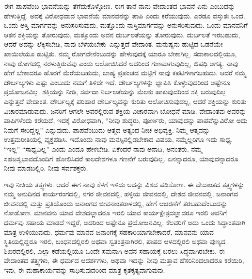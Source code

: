 \vskip 8pt

ಈಗ ಪಾಪವೆಂಬ ಭಾವನೆಯನ್ನು ತೆಗೆದುಕೊಳ್ಳೋಣ. ಈಗ ತಾನೆ ನಾನು ವೇದಾಂತದ ಭಾವನೆ ಏನು ಎಂಬುದನ್ನು ಹೇಳುತ್ತಿದ್ದೆ. ಅದಕ್ಕೆ ವಿರೋಧವಾದ ಭಾವನೆಯೆ ಮಾನವನನ್ನು ಪಾಪಿ ಎಂದು ಕರೆಯುವುದು. ಎರಡೂ ವಸ್ತುತಃ ಒಂದೆ. ಒಂದು ಅಸ್ತಿ ಮಾರ್ಗವನ್ನು ಅನುಸರಿಸುವುದು, ಮತ್ತೊಂದು ನಾಸ್ತಿಮಾರ್ಗವನ್ನು ಅನುಸರಿಸುವುದು. ಒಂದು ಮಾನವನಿಗೆ ಆತನ ಶಕ್ತಿಯನ್ನು ತೋರುವುದು, ಮತ್ತೊಂದು ಅವನ ದುರ್ಬಲತೆಯನ್ನು ತೋರುವುದು. ದುರ್ಬಲತೆ ಇರಬಹುದು, ಆದರೆ ಅದನ್ನು ಲೆಕ್ಕಿಸಬೇಡಿ, ನಾವು ಬೆಳೆಯಬೇಕು–ಎನ್ನುತ್ತದೆ ವೇದಾಂತ. ಮನುಷ್ಯನು ಹುಟ್ಟಿದ ಒಡನೆಯೇ ಖಾಯಿಲೆಯೂ ಹುಟ್ಟಿತು. ನಮ್ಮ ರೋಗವೇನೆಂಬುದನ್ನು ಹೇಳುವುದಕ್ಕೆ ಯಾರೂ ಬೇಕಾಗಿಲ್ಲ. ಸದಾಕಾಲದಲ್ಲಿಯೂ, ನಾವು ರೋಗದಲ್ಲಿ ನರಳುತ್ತಿರುವೆವು ಎಂದು ಆಲೋಚಿಸಿದರೆ ಅದರಿಂದ ಗುಣವಾಗುವುದಿಲ್ಲ, ಔಷಧಿ ಅಗತ್ಯ. ನಾವು ಹೇಗೆ ಬೇಕಾದರೂ ಹೊರಗೆ ಮೆರೆಯಬಹುದು, ಬಾಹ್ಯ ಪ್ರಪಂಚದ ಮಟ್ಟಿಗೆ ನಾವು ಕಪಟಿಗಳಾಗಬಹುದು. ಆದರೆ ನಮ್ಮ ದೌರ್ಬಲ್ಯಗಳು ಎಷ್ಟು ಎಂಬುದು ನಮಗೆ ತಿಳಿದೇ ಇದೆ. ದೌರ್ಬಲ್ಯಗಳನ್ನು ಜ್ಞಾಪಿಸಿ ಕೊಳ್ಳುವುದರಿಂದ ಅಷ್ಟೇನೂ ಪ್ರಯೋಜನವಿಲ್ಲ. ಶಕ್ತಿಯನ್ನು ನೀಡಿ, ಸರ್ವದಾ ನಿರ್ಬಲತೆಯನ್ನು ಮೆಲಕು ಹಾಕುವುದರಿಂದ ಶಕ್ತಿ ಬರುವುದಿಲ್ಲ ಎನ್ನುತ್ತದೆ ವೇದಾಂತ. ದೌರ್ಬಲ್ಯಕ್ಕೆ ಪರಿಹಾರ ದೌರ್ಬಲ್ಯವನ್ನು ಕುರಿತು ಆಲೋಚಿಸುವುದಲ್ಲ, ಆದರೆ ಶಕ್ತಿಯನ್ನು ಕುರಿತು ವಿಚಾರಮಾಡುವುದು. ಜನರಿಗೆ ಆಗಲೇ ಅವರಲ್ಲಿರುವ ಶಕ್ತಿಯ ವಿಚಾರವಾಗಿ ಬೋಧನೆ ಮಾಡಿ. ವೇದಾಂತವು ಅವರನ್ನು ಪಾಪಿಗಳೆಂದು ಕರೆಯದೆ, ಇದಕ್ಕೆ ವಿರೋಧವಾಗಿ, “ನೀವು ಶುದ್ಧರು, ಪೂರ್ಣರು, ಯಾವುದನ್ನು ಪಾಪವೆನ್ನುವಿರೋ ಅದು ನಿಮಗೆ ಸೇರಿದ್ದಲ್ಲ” ಎನ್ನುವುದು. ಪಾಪವೆಂಬುದು ಆತ್ಮದ ಅತ್ಯಂದ ನೀಚ ಅಭಿವ್ಯಕ್ತಿ. ನಿಮ್ಮ ಆತ್ಮವನ್ನು ಉತ್ತಮರೀತಿಯಲ್ಲಿ ವ್ಯಕ್ತಪಡಿಸಿ. ಇದೊಂದು ನಾವು ಮನಸ್ಸಿನಲ್ಲಿಡಬೇಕಾದ ವಿಷಯ, ನಮ್ಮೆಲ್ಲರಿಗೂ ಇದು ಸಾಧ್ಯ. “ಇಲ್ಲ” “ಸಾಧ್ಯವಿಲ್ಲ” ಎಂದು ಎಂದೂ ಹೇಳಬೇಡಿ. ಏಕೆಂದರೆ ನಾವು ಅನಾದಿ, ಅನಂತರು. ನಮ್ಮ ಸಹಜಸ್ವಭಾವದೊಂದಿಗೆ ಹೋಲಿಸಿದರೆ ಕಾಲದೇಶಗಳೂ ಗಣನೆಗೆ ಬರುವುದಿಲ್ಲ. ಏನನ್ನಾದರೂ, ಯಾವುದನ್ನಾದರೂ ನೀವು ಮಾಡಬಲ್ಲಿರಿ. ನೀವು ಸರ್ವಶಕ್ತರು. 

\vskip 9pt

ಇವು ನೀತಿಯ ತತ್ತ್ವಗಳು. ಆದರೆ ಈಗ ನಾವು ಕೆಳಗೆ ಇಳಿದು ಅದನ್ನು ವಿಶದ ಪಡಿಸೋಣ. ಈ ವೇದಾಂತದ ತತ್ತ್ವಗಳನ್ನು ನಮ್ಮ ಅನುದಿನದ ಕಾರ್ಯರಂಗದಲ್ಲಿ, ನಗರ ಜೀವನದಲ್ಲಿ, ಹಳ್ಳಿಯ ಜೀವನದಲ್ಲಿ, ದೇಶದ ಜೀವನದಲ್ಲಿ, ಜನಾಂಗದ ಜೀವನದಲ್ಲಿ ಮತ್ತು ಪ್ರತಿಯೊಂದು ಜನಾಂಗದ ಜೀವನಾಂತರಾಳದಲ್ಲಿ, ಹೇಗೆ ಆಚರಣೆಗೆ ತರಬಹುದೆಂಬುದನ್ನು ನೋಡೋಣ. ಮಾನವನು ಯಾವ ದೇಶದಲ್ಲಾದರೂ ಇರಲಿ ಯಾವ ಕಾರ್ಯಕ್ಷೇತ್ರದಲ್ಲಾದರೂ ಇರಲಿ ಅವನಿಗೆ ಧರ್ಮವು ಸಹಾಯ ಮಾಡದೆ ಇದ್ದರೆ, ಅದರಿಂದ ಅಷ್ಟೇನೂ ಪ್ರಯೋಜನವಿಲ್ಲ. ಕೆಲವರಿಗೆ ಅದು ಒಂದು ಸಿದ್ಧಾಂತವಾಗಿ ಮಾತ್ರ ಉಳಿಯುವುದು. ಧರ್ಮವು ಮಾನವ ಜನಾಂಗಕ್ಕೆ ಸಹಕಾರಿಯಾಗಬೇಕಾದರೆ, ಮಾನವನು ಯಾವ ಸ್ಥಿತಿಯಲ್ಲಿದ್ದರೂ ಇರಲಿ, ಬಂಧನದಲ್ಲಿರಲಿ ಅಥವಾ ಸ್ವತಂತ್ರನಾಗಿರಲಿ, ಪಾಪದ ಆಳದಲ್ಲಿರಲಿ ಅಥವಾ ಪುಣ್ಯದ ಶಿಖರದಲ್ಲಿರಲಿ, ಎಲ್ಲಾ ಕಡೆಯಲ್ಲಿಯೂ ಒಂದೇ ಸಮನಾಗಿ ಅವನ ಸಹಾಯಕ್ಕೆ ಬರಲು ಸಿದ್ಧವಾಗಿರಬೇಕು. ಈ ವೇದಾಂತದ ತತ್ತ್ವಗಳು, ಈ ಧರ್ಮದ ಆದರ್ಶಗಳು, ಅಥವಾ ಇದನ್ನು ನೀವು ಮತ್ತಾವ ಹೆಸರಿನಿಂದಲಾದರೂ ಕರೆಯಿರಿ, ಇವು, ಈ ಮಹಾಕಾರ್ಯವನ್ನು ಸಾಧಿಸುವುದರಿಂದ ಮಾತ್ರ ಕೃತಕೃತ್ಯವಾಗುವುವು. 

\vskip 9pt

